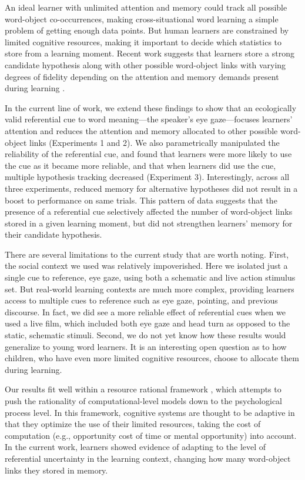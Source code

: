 \documentclass[10pt,letterpaper]{article}
\begin{document}
An ideal learner with unlimited attention and memory could track all possible word-object co-occurrences, making cross-situational word learning a simple problem of getting enough data points. But human learners are constrained by limited cognitive resources, making it important to decide which statistics to store from a learning moment. Recent work suggests that learners store a strong candidate hypothesis along with other possible word-object links with varying degrees of fidelity depending on the attention and memory demands present during learning \cite{yurovsky2014algorithmic}. 

In the current line of work, we extend these findings to show that an ecologically valid referential cue to word meaning---the speaker's eye gaze---focuses learners' attention and reduces the attention and memory allocated to other possible word-object links (Experiments 1 and 2). We also parametrically manipulated the reliability of the referential cue, and found that learners were more likely to use the cue as it became more reliable, and that when learners did use the cue, multiple hypothesis tracking decreased (Experiment 3). Interestingly, across all three experiments, reduced memory for alternative hypotheses did not result in a boost to performance on same trials. This pattern of data suggests that the presence of a referential cue selectively affected the number of word-object links stored in a given learning moment, but did not strengthen learners' memory for their candidate hypothesis. 

There are several limitations to the current study that are worth noting. First, the social context we used was relatively impoverished. Here we isolated just a single cue to reference, eye gaze, using both a schematic and live action stimulus set. But real-world learning contexts are much more complex, providing learners access to multiple cues to reference such as eye gaze, pointing, and previous discourse. In fact, we did see a more reliable effect of referential cues when we used a live film, which included both eye gaze and head turn as opposed to the static, schematic stimuli. Second, we do not yet know how these results would generalize to young word learners. It is an interesting open question as to how children, who have even more limited cognitive resources, choose to allocate them during learning.

Our results fit well within a resource rational framework \cite{griffiths2014rational}, which attempts to push the rationality of computational-level models down to the psychological process level. In this framework, cognitive systems are thought to be adaptive in that they optimize the use of their limited resources, taking the cost of computation (e.g., opportunity cost of time or mental opportunity) into account. In the current work, learners showed evidence of adapting to the level of referential uncertainty in the learning context, changing how many word-object links they stored in memory. 
\end{document}
